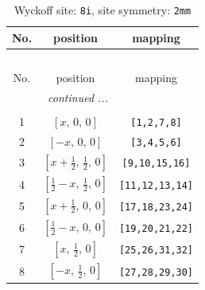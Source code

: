 \documentclass[fleqn,8pt]{jsarticle}
\begin{document}
\renewcommand{\arraystretch}{1.2}
\begin{longtable}{ccc}
\caption{Wyckoff site: {\tt 8i}, site symmetry: {\tt 2mm}}
 \\
 \hline \hline
No. & position & mapping \\ \hline \endfirsthead

\multicolumn{2}{l}{\tablename\ \thetable{}} \\
 \hline \hline
No. & position & mapping \\ \hline \endhead

 \hline \hline
\multicolumn{2}{r}{\footnotesize\it continued ...} \\ \endfoot

 \hline \hline
\multicolumn{2}{r}{} \\ \endlastfoot

1 & $\left[ x,\, 0,\, 0 \right]$ & {\tt [1,2,7,8]} \\ \hline
2 & $\left[ - x,\, 0,\, 0 \right]$ & {\tt [3,4,5,6]} \\ \hline
3 & $\left[ x + \frac{1}{2},\, \frac{1}{2},\, 0 \right]$ & {\tt [9,10,15,16]} \\ \hline
4 & $\left[ \frac{1}{2} - x,\, \frac{1}{2},\, 0 \right]$ & {\tt [11,12,13,14]} \\ \hline
5 & $\left[ x + \frac{1}{2},\, 0,\, 0 \right]$ & {\tt [17,18,23,24]} \\ \hline
6 & $\left[ \frac{1}{2} - x,\, 0,\, 0 \right]$ & {\tt [19,20,21,22]} \\ \hline
7 & $\left[ x,\, \frac{1}{2},\, 0 \right]$ & {\tt [25,26,31,32]} \\ \hline
8 & $\left[ - x,\, \frac{1}{2},\, 0 \right]$ & {\tt [27,28,29,30]} \\
\end{longtable}
\renewcommand{\arraystretch}{1.2}
\end{document}

